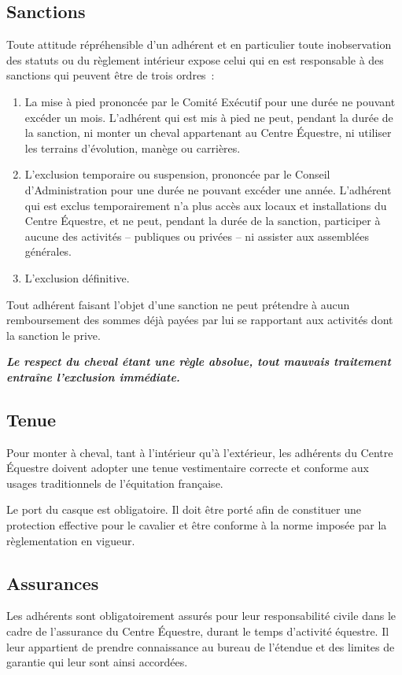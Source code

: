 \documentclass[11pt,a4paper]{article}
\begin{document}
\subsection{Sanctions}
Toute attitude répréhensible d'un adhérent et en particulier toute inobservation des statuts ou du règlement intérieur expose celui qui en est responsable à des sanctions qui peuvent être de trois ordres~:
\begin{enumerate}
\item
La mise à pied prononcée par le Comité Exécutif pour une durée ne pouvant excéder un mois. L'adhérent qui est mis à pied ne peut, pendant la durée de la sanction, ni monter un cheval appartenant au Centre Équestre, ni utiliser les terrains d'évolution, manège ou carrières.
\item
L'exclusion temporaire ou suspension, prononcée par le Conseil d'Administration pour une durée ne pouvant excéder une année. L'adhérent qui est exclus temporairement n'a plus accès aux locaux et installations du Centre Équestre, et ne peut, pendant la durée de la sanction, participer à aucune des activités -- publiques ou privées -- ni assister aux assemblées générales.
\item
L'exclusion définitive.
\end{enumerate}
Tout adhérent faisant l'objet d'une sanction ne peut prétendre à aucun remboursement des sommes déjà payées par lui se rapportant aux activités dont la sanction le prive.

\textit{\textbf{Le respect du cheval étant une règle absolue, tout mauvais traitement entraîne l'exclusion immédiate.}}

\subsection{Tenue}
Pour monter à cheval, tant à l'intérieur qu'à l'extérieur, les adhérents du Centre Équestre doivent adopter une tenue vestimentaire correcte et conforme aux usages traditionnels de l'équitation française.

Le port du casque est obligatoire. Il doit être porté afin de constituer une protection effective pour le cavalier et être conforme à la norme imposée par la règlementation en vigueur.

\subsection{Assurances}
Les adhérents sont obligatoirement assurés pour leur responsabilité civile dans le cadre de l'assurance du Centre Équestre, durant le temps d'activité équestre. Il leur appartient de prendre connaissance au bureau de l'étendue et des limites de garantie qui leur sont ainsi accordées.
\end{document}
